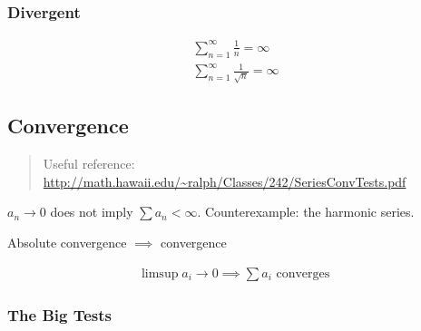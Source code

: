 \hypertarget{divergent}{%
\subsubsection{Divergent}\label{divergent}}

\begin{align*}
\sum_{n=1}^\infty \frac{1}{n} = \infty \\
\sum_{n=1}^\infty \frac{1}{\sqrt n} = \infty 
\end{align*}

\hypertarget{convergence-1}{%
\subsection{Convergence}\label{convergence-1}}

\begin{quote}
Useful reference:
\url{http://math.hawaii.edu/~ralph/Classes/242/SeriesConvTests.pdf}
\end{quote}

\begin{definition}


\end{definition}

\begin{remark}

\(a_n\to 0\) does not imply \(\sum a_n < \infty\). Counterexample: the
harmonic series.

\end{remark}

\begin{proposition}[?]

Absolute convergence \(\implies\) convergence

\end{proposition}

\begin{proposition}

\begin{align*}
\limsup a_i \to 0 \implies \sum a_i \text{ converges }
\end{align*}

\end{proposition}

\hypertarget{the-big-tests}{%
\subsubsection{The Big Tests}\label{the-big-tests}}

